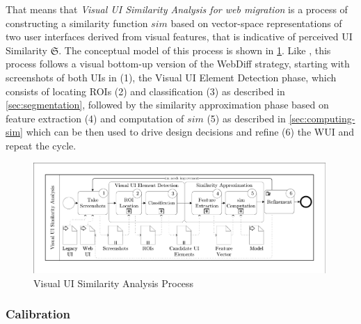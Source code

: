 That means that \emph{Visual UI Similarity Analysis for web migration} is a process of constructing a similarity function \(sim\) based on vector-space representations of two user interfaces derived from visual features, that is indicative of perceived UI Similarity \(\mathfrak{S}\).
The conceptual model of this process is shown in \cref{fig:ci-process}.
Like \autocite{Kong2012}, this process follows a visual bottom-up version of the WebDiff strategy, starting with screenshots of both UIs in (1), the Visual UI Element Detection phase, which consists of locating ROIs (2) and classification (3) as described in \cref{sec:segmentation}, followed by the similarity approximation phase based on feature extraction (4) and computation of \(sim\) (5) as described in \cref{sec:computing-sim} which can be then used to drive design decisions and refine (6) the WUI and repeat the cycle.

\begin{figure}
\hypertarget{fig:ci-process}{%
\centering
\includegraphics[width=0.99\textwidth]{../figures/awsm-ci-process.pdf}
\caption{Visual UI Similarity Analysis Process}\label{fig:ci-process}
}
\end{figure}

\hypertarget{sec:calibration}{%
\subsubsection{Calibration~}\label{sec:calibration}}

